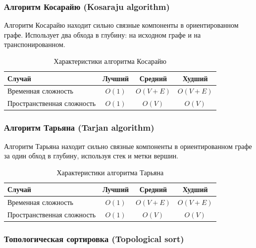 \documentclass[a4paper,12pt]{article}
\begin{document}
\subsubsection{Алгоритм Косарайю (Kosaraju algorithm)}
\label{subsubsec:алгоритм-косарайю-kosaraju-algorithm}

Алгоритм Косарайю находит сильно связные компоненты в ориентированном графе. Использует два обхода в глубину: на исходном графе и на транспонированном.

\begin{table}[H]
    \centering
    \begin{tabular}{|l|c|c|c|}
        \hline
        Случай & Лучший & Средний & Худший \\
        \hline
        Временная сложность & $O(1)$ & $O(V + E)$ & $O(V + E)$ \\
        \hline
        Пространственная сложность & $O(1)$ & $O(V)$ & $O(V)$ \\
        \hline
    \end{tabular}
    \caption{Характеристики алгоритма Косарайю}
\end{table}

\subsubsection{Алгоритм Тарьяна (Tarjan algorithm)}
\label{subsubsec:алгоритм-тарьяна-tarjan-algorithm}

Алгоритм Тарьяна находит сильно связные компоненты в ориентированном графе за один обход в глубину, используя стек и метки вершин.

\begin{table}[H]
    \centering
    \begin{tabular}{|l|c|c|c|}
        \hline
        Случай & Лучший & Средний & Худший \\
        \hline
        Временная сложность & $O(1)$ & $O(V + E)$ & $O(V + E)$ \\
        \hline
        Пространственная сложность & $O(1)$ & $O(V)$ & $O(V)$ \\
        \hline
    \end{tabular}
    \caption{Характеристики алгоритма Тарьяна}
\end{table}

\subsubsection{Топологическая сортировка (Topological sort)}
\label{subsubsec:топологическая-сортировка-topological-sort}
\end{document}

